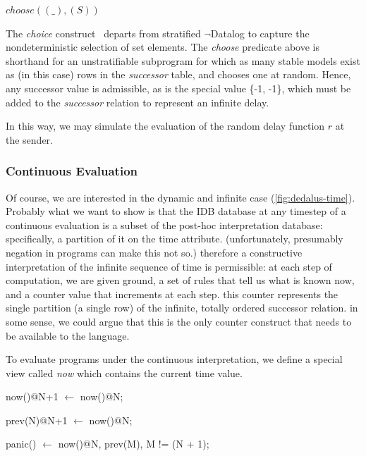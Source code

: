 $choose((\_), (S))$

The \emph{choice} construct~\cite{eventchoice, greedychoice} departs from stratified $\lnot$Datalog to capture the nondeterministic selection
of set elements.  The \emph{choose} predicate above is shorthand for an unstratifiable subprogram for which as many stable models
exist as (in this case) rows in the \emph{successor} table, and chooses one at random.  Hence, any successor value is admissible, as is the
special value \{-1, -1\}, which must be added to the \emph{successor} relation to represent an infinite delay.

In this way, we may simulate the evaluation of the random delay function $r$ at the sender.




\subsubsection{Continuous Evaluation}



Of course, we are interested in the dynamic and infinite case (\ref{fig:dedalus-time}).
Probably what we want to show is that the IDB database at any timestep of a continuous evaluation is a subset
of the post-hoc interpretation database: specifically, a partition of it on the time attribute.  (unfortunately, presumably
negation in programs can make this not so.)  therefore a constructive interpretation of the infinite sequence of time is permissible:
at each step of computation, we are given ground, a set of rules that tell us what is known now, and a counter value that increments
at each step.  this counter represents the single partition (a single row) of the infinite, totally ordered successor relation.
in some sense, we could argue that this is the only counter construct that needs to be available to the language.


To evaluate programs under the continuous interpretation, we define a special view called \emph{now} which contains the current 
time value.

\begin{Dedalus}
now()@N+1  \(\leftarrow\)
    now()@N;

prev(N)@N+1  \(\leftarrow\)
    now()@N;

panic()  \(\leftarrow\)
    now()@N,
    prev(M),
    M != (N + 1);
\end{Dedalus}


